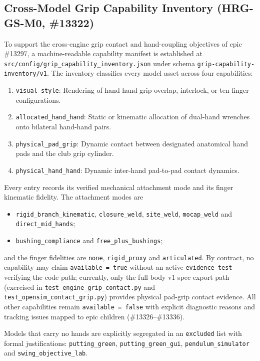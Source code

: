 \documentclass[11pt,a4paper]{article}
\begin{document}
\subsection{Cross-Model Grip Capability Inventory (HRG-GS-M0, \#13322)}
To support the cross-engine grip contact and hand-coupling objectives of epic
\#13297, a machine-readable capability manifest is established at
\texttt{src/config/grip\_capability\_inventory.json} under schema
\texttt{grip-capability-inventory/v1}. The inventory classifies every model asset
across four capabilities:
\begin{enumerate}
\item \texttt{visual\_style}: Rendering of hand-hand grip overlap, interlock, or ten-finger configurations.
\item \texttt{allocated\_hand\_hand}: Static or kinematic allocation of dual-hand wrenches onto bilateral hand-hand pairs.
\item \texttt{physical\_pad\_grip}: Dynamic contact between designated anatomical hand pads and the club grip cylinder.
\item \texttt{physical\_hand\_hand}: Dynamic inter-hand pad-to-pad contact dynamics.
\end{enumerate}

Every entry records its verified mechanical attachment mode and its finger
kinematic fidelity.  The attachment modes are
\begin{itemize}[nosep]
  \item \texttt{rigid\_branch\_kinematic}, \texttt{closure\_weld}, \texttt{site\_weld},
    \texttt{mocap\_weld} and \texttt{direct\_mid\_hands};
  \item \texttt{bushing\_compliance} and \texttt{free\_plus\_bushings};
\end{itemize}
and the finger fidelities are \texttt{none}, \texttt{rigid\_proxy} and
\texttt{articulated}.
By contract, no capability may claim \texttt{available = true} without an active
\texttt{evidence\_test} verifying the code path; currently, only the full-body-v1
spec export path (exercised in \texttt{test\_engine\_grip\_contact.py} and
\texttt{test\_opensim\_contact\_grip.py}) provides physical pad-grip contact
evidence. All other capabilities remain \texttt{available = false} with explicit
diagnostic reasons and tracking issues mapped to epic children (\#13326--\#13336).

Models that carry no hands are explicitly segregated in an \texttt{excluded}
list with formal justifications: \texttt{putting\_green},
\texttt{putting\_green\_gui}, \texttt{pendulum\_simulator} and
\texttt{swing\_objective\_lab}.
\end{document}
